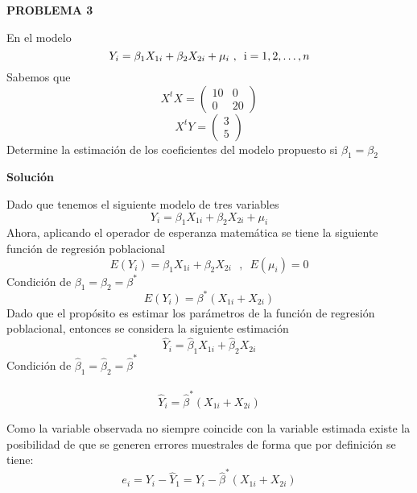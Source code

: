 \documentclass[10pt,a4paper, openany ]{book}
\begin{document}
  \pagecolor{pagecolor}
  \color{verdeclaro}
  \newpage
  \Large
  \begin{center}
        \textbf{PROBLEMA 3}
    \end{center}
    En el modelo
    \begin{equation*}
        Y_{i} = \beta_{1}X_{1i}+\beta_{2}X_{2i}+\mu_{i} \, \, , \, \, \, \textup{i} = 1,2,\dots ,n
    \end{equation*}
    Sabemos que
    \begin{equation*}
        X^{t}X = \begin{pmatrix}
    10 & 0 \\
      0 & 20 
    \end{pmatrix}
    \end{equation*}
    \begin{equation*}
        X^{t}Y = \begin{pmatrix}
    3 \\
      5  
    \end{pmatrix}
    \end{equation*}
    Determine la estimación de los coeficientes del modelo propuesto si $\beta_{1} = \beta_{2}$
    \begin{center}
        \textbf{Solución}
    \end{center}

    \noindent   Dado que tenemos el siguiente modelo de tres variables 
    \[
    Y_{i} = \beta_{1}X_{1i}+\beta_{2}X_{2i}+\mu_{i}
    \]
    Ahora, aplicando el operador de esperanza matemática se tiene la siguiente función de regresión poblacional
    \[
    E(Y_{i}) = \beta_{1}X_{1i}+\beta_{2}X_{2i} \, \, \,\, , \, \, \, E(\mu_{i}) = 0
    \]
    Condición de $\beta_{1} = \beta_{2} = \beta^{*}$
    \[
    E(Y_{i}) = \beta^{*}\left(X_{1i}+X_{2i}\right)
    \]
    Dado que el propósito es estimar los parámetros de la función de regresión poblacional, entonces se considera la siguiente estimación 
    \[
    \hat{Y}_{i} = \hat{\beta}_{1}X_{1i}+\hat{\beta}_{2}X_{2i} 
    \]
    Condición de $\hat{\beta}_{1} =\hat{\beta}_{2} = \hat{\beta}^{*}$\\\\
    \[
    \hat{Y}_{i} =\hat{\beta}^{*} \left(X_{1i}+X_{2i}\right) 
    \]
    
    
    \noindent Como la variable observada no siempre coincide con la variable estimada existe la posibilidad de que se generen errores muestrales de forma que por definición se tiene:
    \[
    e_{i} = Y_{i}-\hat{Y}_{1} = Y_{i}-\hat{\beta}^{*} \left(X_{1i}+X_{2i}\right)  
    \]
\end{document}
